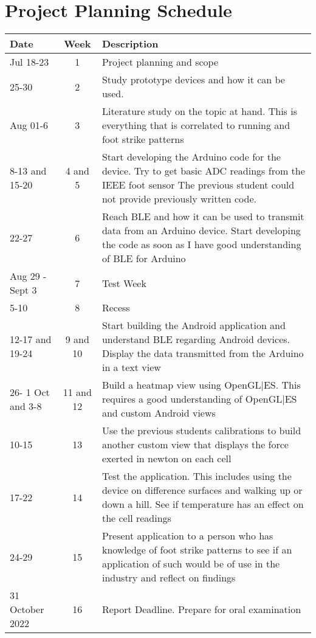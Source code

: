 \graphicspath{{appendices/fig/}}
\chapter{Project Planning Schedule}
\makeatletter{}\makeatother
\label{appen:projectplan}
    \begin{tabular}{ | m{5em} |c|m{12cm}| }
      \hline
      \textbf{Date} & \textbf{Week} & \textbf{Description} \\
      \hline
      Jul 18-23 & 1 & Project planning and scope \\ 
      \hline
      25-30 & 2 & Study prototype devices and how it can be used.\\ 
      \hline
      Aug 01-6 & 3 & Literature study on the topic at hand. This is everything that is correlated to running and foot strike patterns \\ 
      \hline
      8-13 and 15-20 & 4 and 5 & Start developing the Arduino code for the device. Try to get basic ADC readings from the IEEE foot sensor The previous student could not provide previously written code. \\ 
      \hline
      22-27 & 6 & Reach BLE and how it can be used to transmit data from an Arduino device. Start developing the code as soon as I have good understanding of BLE for Arduino \\ 
      \hline
      Aug 29 - Sept 3& 7 & Test Week \\ 
      \hline
      5-10 & 8 & Recess \\ 
      \hline
      12-17 and 19-24  & 9 and 10 & Start building the Android application and understand BLE regarding Android devices. Display the data transmitted from the Arduino in a text view \\ 
      \hline
      26- 1 Oct and 3-8 & 11 and 12 & Build a heatmap view using OpenGL|ES. This requires a good understanding of OpenGL|ES and custom Android views  \\ 
      \hline
      10-15 & 13 & Use the previous students calibrations to build another custom view that displays the force exerted in newton on each cell \\ 
      \hline
      17-22  & 14 & Test the application. This includes using the device on difference surfaces and walking up or down a hill. See if temperature has an effect on the cell readings \\ 
      \hline
      24-29 & 15 & Present application to a person who has knowledge of foot strike patterns to see if an application of such would be of use in the industry and reflect on findings \\ 
      \hline
      31 October 2022 & 16 & Report Deadline. Prepare for oral examination \\ 
      \hline
    \end{tabular}
